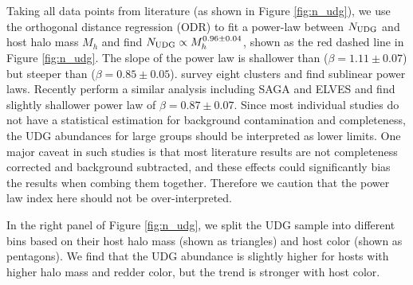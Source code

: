 \documentclass[twocolumn,astrosymb,twocolappendix]{aastex631}
\begin{document}
\begin{CJK*}{UTF8}{gbsn}
Taking all data points from literature (as shown in Figure \ref{fig:n_udg}), we use the orthogonal distance regression (ODR) to fit a power-law between $N_{\rm UDG}$ and host halo mass $M_h$ and find $N_{\rm UDG} \propto M_h^{0.96\pm 0.04}$, shown as the red dashed line in Figure \ref{fig:n_udg}. The slope of the power law is shallower than \citet{vdBurg2017} ($\beta=1.11\pm0.07$) but steeper than \citet{Roman2017b} ($\beta=0.85\pm0.05$). \citet{ManceraPina2018} survey eight clusters and find sublinear power laws. Recently \citet{Karunakaran2022b} perform a similar analysis including SAGA and ELVES and find slightly shallower power law of $\beta=0.87\pm0.07$. Since most individual studies do not have a statistical estimation for background contamination and completeness, the UDG abundances for large groups should be interpreted as lower limits. One major caveat in such studies is that most literature results are not completeness corrected and background subtracted, and these effects could significantly bias the results when combing them together. Therefore we caution that the power law index here should not be over-interpreted. 

In the right panel of Figure \ref{fig:n_udg}, we split the UDG sample into different bins based on their host halo mass (shown as triangles) and host color (shown as pentagons). We find that the UDG abundance is slightly higher for hosts with higher halo mass and redder color, but the trend is stronger with host color. 
\vspace{1em}


\end{CJK*}
\end{document}
